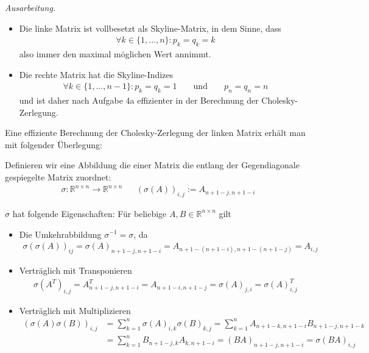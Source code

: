 \documentclass[titlepage]{article}
\newenvironment{ausarbeitung}{\vspace{3mm}\noindent\textit{Ausarbeitung.}}{}
\begin{document}
\begin{ausarbeitung}
	\begin{itemize}
		\item Die linke Matrix ist vollbesetzt als Skyline-Matrix, in dem Sinne, dass 
		\begin{align*}
			\forall k \in \{1, ..., n\}: p_k = q_k = k
		\end{align*}
		also immer den maximal möglichen Wert annimmt.
		
		\item Die rechte Matrix hat die Skyline-Indizes 
		\begin{align*}
			\forall k \in \{1, ..., n - 1\}: p_k = q_k = 1 && \text{ und } && p_n = q_n = n
		\end{align*}
		und ist daher nach Aufgabe 4a effizienter in der Berechnung der Cholesky-Zerlegung.
	\end{itemize}
	
	Eine effiziente Berechnung der Cholesky-Zerlegung der linken Matrix erhält man mit folgender Überlegung:
	
	Definieren wir eine Abbildung die einer Matrix die entlang der Gegendiagonale gespiegelte Matrix zuordnet:
	\begin{align*}
		\sigma: \mathbb{R}^{n\times n} \rightarrow \mathbb{R}^{n \times n} && (\sigma(A))_{i,j} := A_{n+1-j, n+1-i}
	\end{align*}
	
	$\sigma$ hat folgende Eigenschaften: Für beliebige $A,B \in \mathbb{R}^{n \times n}$ gilt
	
	\begin{itemize}
		\item Die Umkehrabbildung $\sigma^{-1} = \sigma$, da
			\begin{align*}
				\sigma(\sigma(A))_{ij} = \sigma(A)_{n+1-j,n+1-i} = A_{n+1-(n+1-i),n+1-(n+1-j)} = A_{i,j}
			\end{align*}
		
		\item Verträglich mit Transponieren
			\begin{align*}
				\sigma(A^T)_{i,j} = A^T_{n+1-j,n+1-i} = A_{n+1-i,n+1-j} = \sigma(A)_{j,i} = \sigma(A)^T_{i,j}
			\end{align*}
		\item Verträglich mit Multiplizieren
			\begin{align*}
				(\sigma(A)\sigma(B))_{i,j} &= \sum_{k=1}^{n}\sigma(A)_{i,k}\sigma(B)_{k,j} = \sum_{k=1}^{n} A_{n+1-k,n+1-i}B_{n+1-j,n+1-k} \\
				&= \sum_{k=1}^{n} B_{n+1-j,k}A_{k,n+1-i} = (BA)_{n+1-j,n+1-i} = \sigma(BA)_{i,j}
			\end{align*}
		

\end{itemize}
\end{ausarbeitung}
\end{document}
